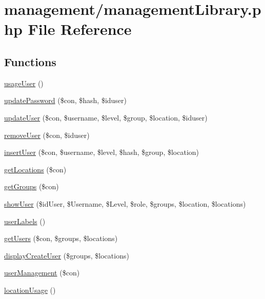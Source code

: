 \hypertarget{management_library_8php}{}\section{management/management\+Library.php File Reference}
\label{management_library_8php}
\subsection*{Functions}
\begin{DoxyCompactItemize}
\item 
\hyperlink{management_library_8php_afd0225001cc049f6f5701e479e1a4df4}{usage\+User} ()
\item 
\hyperlink{management_library_8php_a86b4cedfa00c35b188665e195644133c}{update\+Password} (\$con, \$hash, \$iduser)
\item 
\hyperlink{management_library_8php_a0e88fb337daef3ad8d29945f1ee22baf}{update\+User} (\$con, \$username, \$level, \$group, \$location, \$iduser)
\item 
\hyperlink{management_library_8php_affc38218672d80d3cbcda052315d0242}{remove\+User} (\$con, \$iduser)
\item 
\hyperlink{management_library_8php_a8da30afc30d3413869dde31dc2128205}{insert\+User} (\$con, \$username, \$level, \$hash, \$group, \$location)
\item 
\hyperlink{management_library_8php_a80f0f920d3c753bb4d3ce744c602f22c}{get\+Locations} (\$con)
\item 
\hyperlink{management_library_8php_a79d3cddb0de99e66cd1c70721a390359}{get\+Groups} (\$con)
\item 
\hyperlink{management_library_8php_a615ceccc071300a7956ce80811393d4c}{show\+User} (\$id\+User, \$Username, \$Level, \$role, \$groups, \$location, \$locations)
\item 
\hyperlink{management_library_8php_ac8ca2b7c4eec58961a6f24cf0050905a}{user\+Labels} ()
\item 
\hyperlink{management_library_8php_ae3f0409601bd4654935f69bc3d7b5fe9}{get\+Users} (\$con, \$groups, \$locations)
\item 
\hyperlink{management_library_8php_a4e732f267ed8ed2b289d955d526f182a}{display\+Create\+User} (\$groups, \$locations)
\item 
\hyperlink{management_library_8php_a62a689da57ef7cf5d65aae05e1a01fd2}{user\+Management} (\$con)
\item 
\hyperlink{management_library_8php_a427ecd502df906d1bd92debd58818ea5}{location\+Usage} ()

\end{DoxyCompactItemize}
